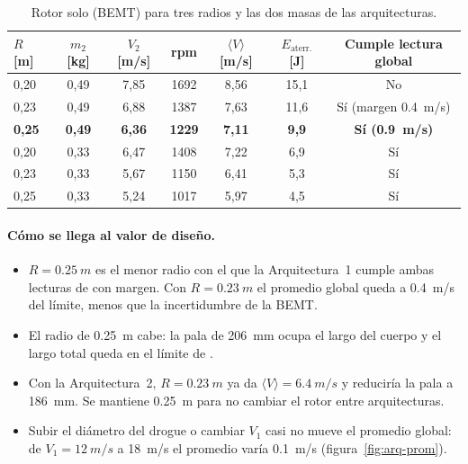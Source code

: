 \begin{table}[H]
\centering\small
\caption{Rotor solo (BEMT) para tres radios y las dos masas de las arquitecturas.}\label{tab:arq-mapa}
\begin{tabular}{@{}lcccccc@{}}
\toprule
$R$ [m] & $m_2$ [kg] & $V_2$ [m/s] & rpm & $\langle V\rangle$ [m/s] & $E_\text{aterr.}$ [J] & Cumple lectura global\\\midrule
0,20 & 0,49 & 7,85 & \num{1692} & 8,56 & 15,1 & No\\
0,23 & 0,49 & 6,88 & \num{1387} & 7,63 & 11,6 & Sí (margen \SI{0.4}{m/s})\\
\textbf{0,25} & \textbf{0,49} & \textbf{6,36} & \textbf{\num{1229}} & \textbf{7,11} & \textbf{9,9} & \textbf{Sí (\SI{0.9}{m/s})}\\
0,20 & 0,33 & 6,47 & \num{1408} & 7,22 & 6,9 & Sí\\
0,23 & 0,33 & 5,67 & \num{1150} & 6,41 & 5,3 & Sí\\
0,25 & 0,33 & 5,24 & \num{1017} & 5,97 & 4,5 & Sí\\
\bottomrule
\end{tabular}
\end{table}

\paragraph{Cómo se llega al valor de diseño.}
\begin{itemize}
  \item $R=\SI{0.25}{m}$ es el menor radio con el que la Arquitectura~1 cumple ambas lecturas
        de  con margen. Con $R=\SI{0.23}{m}$ el promedio global queda a
        \SI{0.4}{m/s} del límite, menos que la incertidumbre de la BEMT.
  \item El radio de \SI{0.25}{m} cabe: la pala de \SI{206}{mm} ocupa el largo del cuerpo y
        el largo total queda en el límite de .
  \item Con la Arquitectura~2, $R=\SI{0.23}{m}$ ya da $\langle V\rangle=\SI{6.4}{m/s}$ y reduciría
        la pala a \SI{186}{mm}. Se mantiene \SI{0.25}{m} para no cambiar el rotor entre
        arquitecturas.
  \item Subir el diámetro del drogue o cambiar $V_1$ casi no mueve el promedio global: de
        $V_1=\SI{12}{m/s}$ a \SI{18}{m/s} el promedio varía \SI{0.1}{m/s}
        (figura~\ref{fig:arq-prom}).
\end{itemize}

